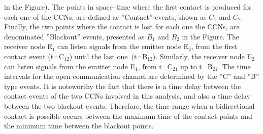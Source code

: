 \documentclass[crop]{CSLB}
\newcommand{\cetis}{CCNs}
\begin{document}
in the Figure).
%
The points in space--time where the first contact is produced for each
one of the \cetis{}, are defined as ''Contact'' events, shown as $C_1$
and $C_2$.
%
Finally, the two points where the contact is lost for each one the
\cetis{}, are denominated ''Blackout'' events, presented as $B_1$ and
$B_2$ in the Figure.
%
The receiver node E$_1$ can listen signals from the emitter node
E$_2$, from the first contact event (t=C$_{12}$) until the last
one (t=B$_{12}$).
%
Similarly, the receiver node E$_2$ can listen signals from the emitter
node E$_1$, from t=C$_{21}$ up to t=B$_{21}$.
%
The time intervals for the open communication channel are determined
by the ''C'' and ''B'' type events.
%
It is noteworthy the fact that there is a time delay between the
contact events of the two \cetis{} involved in this analysis, and also
a time delay between the two blackout events.
%
Therefore, the time range when a bidirectional contact is possible
occurs between the maximum time of the contact points and the minimum
time between the blackout points.
\end{document}
